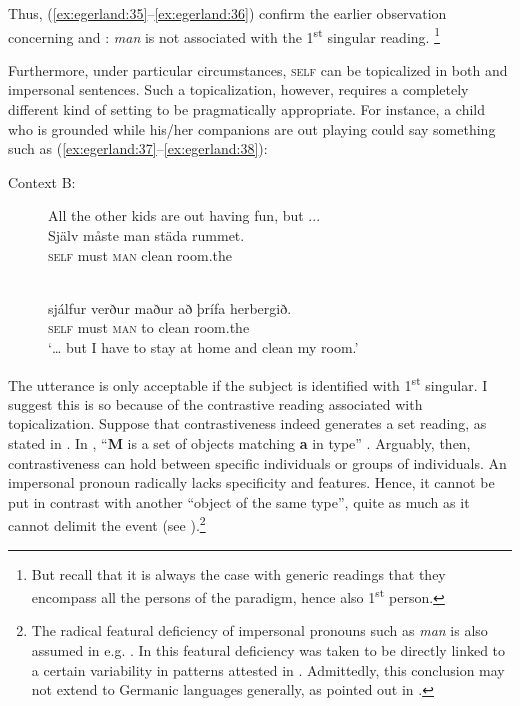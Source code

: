 \documentclass[output=paper]{LSP/langsci}
\begin{document}
Thus, (\ref{ex:egerland:35}--\ref{ex:egerland:36}) confirm the earlier observation concerning  and :  \textit{man} is not associated with the 1\textsuperscript{st} singular reading. \footnote{But recall that it is always the case with generic readings that they encompass all the persons of the paradigm, hence also 1\textsuperscript{st} person.}

Furthermore, under particular circumstances, \textsc{self} can be topicalized in both  and  impersonal sentences. Such a topicalization, however, requires a completely different kind of setting to be pragmatically appropriate. For instance, a child who is grounded while his/her companions are out playing could say something such as (\ref{ex:egerland:37}--\ref{ex:egerland:38}):

\begin{description}
\item[Context B:] All the other kids are out having fun, but ...
\ea\label{ex:egerland:37}
\\
\gll Själv  måste    man  städa  rummet.\\
\textsc{self}  must    \textsc{man}  clean  room.the\\
\z

\ea\label{ex:egerland:38}
\\
\gll sjálfur  verður  maður  að  þrífa  herbergið.\\
\textsc{self}    must    \textsc{man}    to  clean  room.the\\
\glt ‘… but I have to stay at home and clean my room.’
\z
\end{description}

The utterance is only acceptable if the subject is identified with 1\textsuperscript{st} singular. I suggest this is so because of the contrastive reading associated with topicalization. Suppose that contrastiveness indeed generates a set reading, as stated in . In , “\textbf{M} is a set of objects matching \textbf{a} in  type” \citep[84]{VallduvíVilkuna1998}. Arguably, then, contrastiveness can hold between specific individuals or groups of individuals. An impersonal pronoun radically lacks specificity and  features. Hence, it cannot be put in contrast with another “object of the same  type”, quite as much as it cannot delimit the event (see ).\footnote{The radical featural deficiency of impersonal pronouns such as \textit{man} is also assumed in e.g.  \citet{CabredoHofherr2010}. In \citet{Egerland2003romance} this featural deficiency was taken to be directly linked to a certain variability in  patterns attested in . Admittedly, this conclusion may not extend to Germanic languages generally, as pointed out in \citet{Malamud2012}.}
\end{document}
